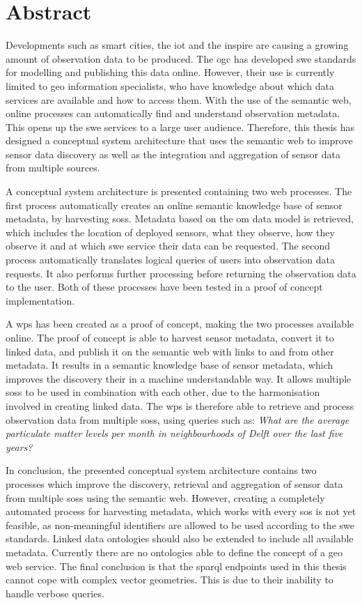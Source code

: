 
\chapter*{Abstract}


Developments such as smart cities, the \acf*{iot} and the \ac*{inspire} are causing a growing amount of observation data to be produced. The \ac*{ogc} has developed \ac*{swe} standards for modelling and publishing this data online. However, their use is currently limited to geo information specialists, who have knowledge about which data services are available and how to access them. With the use of the semantic web, online processes can automatically find and understand observation metadata. This opens up the \acs*{swe} services to a large user audience. Therefore, this thesis has designed a conceptual system architecture that uses the semantic web to improve sensor data discovery as well as the integration and aggregation of sensor data from multiple sources.

A conceptual system architecture is presented containing two web processes. The first process automatically creates an online semantic knowledge base of sensor metadata, by harvesting \aclp*{sos}. Metadata based on the \acf*{om} data model is retrieved, which includes the location of deployed sensors, what they observe, how they observe it and at which \acs*{swe} service their data can be requested. The second process automatically translates logical queries of users into observation data requests. It also performs further processing before returning the observation data to the user. Both of these processes have been tested in a proof of concept implementation.

A \ac*{wps} has been created as a proof of concept, making the two processes available online. The proof of concept is able to harvest sensor metadata, convert it to linked data, and publish it on the semantic web with links to and from other metadata. It results in a semantic knowledge base of sensor metadata, which improves the discovery their in a machine understandable way. It allows multiple \aclp*{sos} to be used in combination with each other, due to the harmonisation involved in creating linked data. The \acs*{wps} is therefore able to retrieve and process observation data from multiple \aclp*{sos}, using queries such as: \textit{What are the average particulate matter levels per month in neighbourhoods of Delft over the last five years?}  
 
In conclusion, the presented conceptual system architecture contains two processes which improve the discovery, retrieval and aggregation of sensor data from multiple \aclp*{sos} using the semantic web. However, creating a completely automated process for harvesting metadata, which works with every \acl*{sos} is not yet feasible, as non-meaningful identifiers are allowed to be used according to the \acs*{swe} standards. Linked data ontologies should also be extended to include all available metadata. Currently there are no ontologies able to define the concept of a geo web service. The final conclusion is that the \acs*{sparql} endpoints used in this thesis cannot cope with complex vector geometries. This is due to their inability to handle verbose queries. 